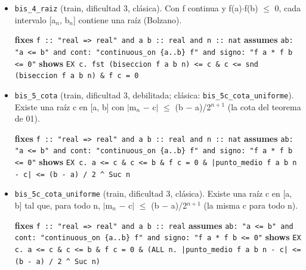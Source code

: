 \documentclass[11pt,a4paper]{article}
\begin{document}
\begin{itemize}
  \item \texttt{bis\_\allowbreak{}4\_\allowbreak{}raiz} (train, dificultad 3, clásica). Con f continua y f(a)$\cdot $f(b) $\le $ 0, cada intervalo [a$_{n}$, b$_{n}$] contiene una raíz (Bolzano).\\
  {\footnotesize \textbf{fixes} \texttt{f :\allowbreak{}:\allowbreak{} "real =\allowbreak{}> real" and a b :\allowbreak{}:\allowbreak{} real and n :\allowbreak{}:\allowbreak{} nat} \textbf{assumes} \texttt{ab:\allowbreak{} "a <=\allowbreak{} b" and cont:\allowbreak{} "continuous\_\allowbreak{}on \{a..b\} f" and signo:\allowbreak{} "f a *\allowbreak{} f b <=\allowbreak{} 0"} \textbf{shows} \texttt{EX c. fst (\allowbreak{}biseccion f a b n) <=\allowbreak{} c \&\allowbreak{} c <=\allowbreak{} snd (\allowbreak{}biseccion f a b n) \&\allowbreak{} f c =\allowbreak{} 0}\par}
  \item \texttt{bis\_\allowbreak{}5\_\allowbreak{}cota} (train, dificultad 3, debilitada; clásica: \texttt{bis\_\allowbreak{}5c\_\allowbreak{}cota\_\allowbreak{}uniforme}). Existe una raíz c en [a, b] con $|$m$_{n}$ $-$ c$|$ $\le $ (b $-$ a)/2$^{n+1}$ (la cota del teorema de 01).\\
  {\footnotesize \textbf{fixes} \texttt{f :\allowbreak{}:\allowbreak{} "real =\allowbreak{}> real" and a b :\allowbreak{}:\allowbreak{} real and n :\allowbreak{}:\allowbreak{} nat} \textbf{assumes} \texttt{ab:\allowbreak{} "a <=\allowbreak{} b" and cont:\allowbreak{} "continuous\_\allowbreak{}on \{a..b\} f" and signo:\allowbreak{} "f a *\allowbreak{} f b <=\allowbreak{} 0"} \textbf{shows} \texttt{EX c. a <=\allowbreak{} c \&\allowbreak{} c <=\allowbreak{} b \&\allowbreak{} f c =\allowbreak{} 0 \&\allowbreak{} |\allowbreak{}punto\_\allowbreak{}medio f a b n -\allowbreak{} c|\allowbreak{} <=\allowbreak{} (\allowbreak{}b -\allowbreak{} a) /\allowbreak{} 2 \textasciicircum{} Suc n}\par}
  \item \texttt{bis\_\allowbreak{}5c\_\allowbreak{}cota\_\allowbreak{}uniforme} (train, dificultad 3, clásica). Existe una raíz c en [a, b] tal que, para todo n, $|$m$_{n}$ $-$ c$|$ $\le $ (b $-$ a)/2$^{n+1}$ (la misma c para todo n).\\
  {\footnotesize \textbf{fixes} \texttt{f :\allowbreak{}:\allowbreak{} "real =\allowbreak{}> real" and a b :\allowbreak{}:\allowbreak{} real} \textbf{assumes} \texttt{ab:\allowbreak{} "a <=\allowbreak{} b" and cont:\allowbreak{} "continuous\_\allowbreak{}on \{a..b\} f" and signo:\allowbreak{} "f a *\allowbreak{} f b <=\allowbreak{} 0"} \textbf{shows} \texttt{EX c. a <=\allowbreak{} c \&\allowbreak{} c <=\allowbreak{} b \&\allowbreak{} f c =\allowbreak{} 0 \&\allowbreak{} (\allowbreak{}ALL n. |\allowbreak{}punto\_\allowbreak{}medio f a b n -\allowbreak{} c|\allowbreak{} <=\allowbreak{} (\allowbreak{}b -\allowbreak{} a) /\allowbreak{} 2 \textasciicircum{} Suc n)}\par}

\end{itemize}
\end{document}
